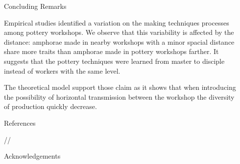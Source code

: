 \documentclass[final]{beamer}
\newlength{\sepwid}
\newlength{\onecolwid}
\begin{document}
\begin{frame}[t]
\begin{columns}[t]
\begin{column}{\sepwid}\end{column} %

\begin{column}{\onecolwid} %

\begin{block}{Concluding Remarks}

Empirical studies identified a variation on the making techniques processes among pottery workshops. We observe that this variability is affected by the distance: amphorae made in nearby workshops with a minor spacial distance share more traits than amphorae made in pottery workshops farther. It suggests that the pottery techniques were learned from master to disciple instead of workers with the same level. 

The theoretical model support those claim as it shows that when introducing the possibility of horizontal transmission between the workshop the diversity of production quickly decrease.
\cite{lycett2015}
 
\end{block}

\begin{block}{References}

	\scriptsize
	\renewcommand{\refname}{\vspace{-0.5em}}
	//
	

\end{block}



\begin{block}{Acknowledgements}

\small{}

\end{block}





\end{column}
\end{columns}
\end{frame}
\end{document}

